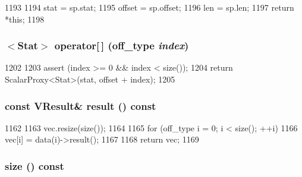 \begin{DoxyCode}
1193     {
1194         stat = sp.stat;
1195         offset = sp.offset;
1196         len = sp.len;
1197         return *this;
1198     }
\end{DoxyCode}
\hypertarget{classStats_1_1VectorProxy_a299d54868a222e0032da86d556d5303a}{
\subsubsection[{operator[]}]{$<$Stat$>$ operator\mbox{[}$\,$\mbox{]} ({\bf off\_\-type} {\em index})}}
\label{classStats_1_1VectorProxy_a299d54868a222e0032da86d556d5303a}



\begin{DoxyCode}
1202     {
1203         assert (index >= 0 && index < size());
1204         return ScalarProxy<Stat>(stat, offset + index);
1205     }
\end{DoxyCode}
\hypertarget{classStats_1_1VectorProxy_aba312f9e3431b1652f8b3ddf3fe105dc}{
\subsubsection[{result}]{\setlength{\rightskip}{0pt plus 5cm}const {\bf VResult}\& result () const}}
\label{classStats_1_1VectorProxy_aba312f9e3431b1652f8b3ddf3fe105dc}



\begin{DoxyCode}
1162     {
1163         vec.resize(size());
1164 
1165         for (off_type i = 0; i < size(); ++i)
1166             vec[i] = data(i)->result();
1167 
1168         return vec;
1169     }
\end{DoxyCode}
\hypertarget{classStats_1_1VectorProxy_a503ab01f6c0142145d3434f6924714e7}{
\subsubsection[{size}]{ size () const}}
\label{classStats_1_1VectorProxy_a503ab01f6c0142145d3434f6924714e7}



